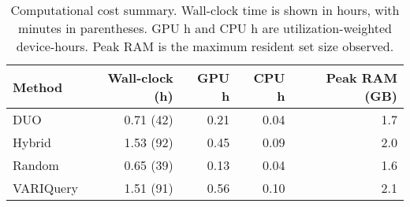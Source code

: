 \begin{table}[h]
  \centering
  \begin{tabular}{lrrrr}
    \toprule
    \textbf{Method} & \textbf{Wall-clock (h)} & \textbf{GPU h} & \textbf{CPU h} & \textbf{Peak RAM (GB)} \\
    \midrule
    DUO        & 0.71 (42)       & 0.21   & 0.04   & 1.7            \\
    Hybrid     & 1.53 (92)       & 0.45   & 0.09   & 2.0            \\
    Random     & 0.65 (39)       & 0.13   & 0.04   & 1.6            \\
    VARIQuery  & 1.51 (91)       & 0.56   & 0.10   & 2.1            \\
    \bottomrule
  \end{tabular}
  \caption{Computational cost summary. Wall-clock time is shown in hours, with minutes in parentheses. GPU h and CPU h are utilization-weighted device-hours. Peak RAM is the maximum resident set size observed.}
  \label{tab:results:overhead}
\end{table}